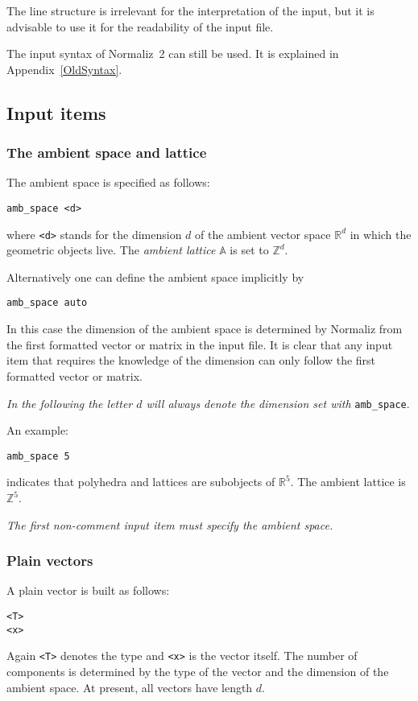 \documentclass[12pt,a4paper]{scrartcl}
\theoremstyle{definition}
\def\ZZ{{\mathbb Z}}
\def\RR{{\mathbb R}}
\def\AA{{\mathbb A}}
\def\ttt{\texttt}
\begin{document}
The line structure is irrelevant for the interpretation of the input, but it is advisable to use it for the readability of the input file.

The input syntax of Normaliz~2 can still be used. It is explained in Appendix~\ref{OldSyntax}.

\subsection{Input items}

\subsubsection{The ambient space and lattice}

The ambient space is specified as follows:
\begin{Verbatim}
amb_space <d>
\end{Verbatim}
where \ttt{<d>} stands for the dimension $d$ of the ambient vector space $\RR^d$ in which the geometric objects live. The \emph{ambient lattice} $\AA$ is set to $\ZZ^d$.

Alternatively one can define the ambient space implicitly by
\begin{Verbatim}
amb_space auto
\end{Verbatim}
In this case the dimension of the ambient space is determined by Normaliz from the first formatted vector or matrix in the input file. It is clear that any input item that requires the knowledge of the dimension can only follow the first formatted vector or matrix.

\emph{In the following the letter $d$ will always denote the dimension set with} \verb|amb_space|.


An example:
\begin{Verbatim}
amb_space 5
\end{Verbatim}
indicates that polyhedra and lattices are subobjects of $\RR^5$. The ambient lattice is $\ZZ^5$.

\emph{The first non-comment input item must specify the ambient space.}

\subsubsection{Plain vectors}

A plain vector is built as follows:
\begin{Verbatim}
<T>
<x>
\end{Verbatim}
Again \ttt{<T>} denotes the type and \ttt{<x>} is the vector itself. The number of components is determined by the type of the vector and the dimension of the ambient space. At present, all vectors have length $d$.
\end{document}
